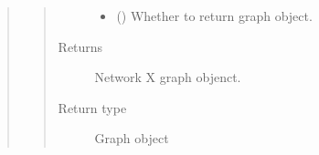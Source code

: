 \documentclass[letterpaper,10pt,english]{sphinxmanual}
\begin{document}
\begin{quote}
\begin{fulllineitems}
\begin{quote}
\begin{description}
\begin{itemize}
\item {} 
 () \textendash{} Whether to return graph object.

\end{itemize}

\item[{Returns}] \leavevmode
Network X graph objenct.

\item[{Return type}] \leavevmode
Graph object

\end{description}\end{quote}

\end{fulllineitems}

\end{quote}
\end{document}
